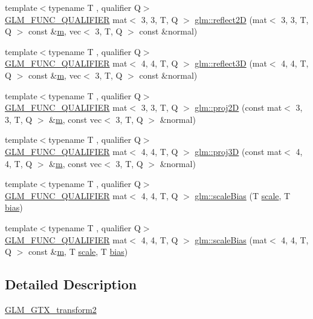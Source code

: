 \begin{DoxyCompactItemize}
\item 
{\footnotesize template$<$typename T , qualifier Q$>$ }\\\hyperlink{setup_8hpp_a33fdea6f91c5f834105f7415e2a64407}{G\+L\+M\+\_\+\+F\+U\+N\+C\+\_\+\+Q\+U\+A\+L\+I\+F\+I\+ER} mat$<$ 3, 3, T, Q $>$ \hyperlink{namespaceglm_ac437357f6021e295f9c4470913141014}{glm\+::reflect2D} (mat$<$ 3, 3, T, Q $>$ const \&\hyperlink{_s_d_l__opengl__glext_8h_af593500c283bf1a787a6f947f503a5c2}{m}, vec$<$ 3, T, Q $>$ const \&normal)
\item 
{\footnotesize template$<$typename T , qualifier Q$>$ }\\\hyperlink{setup_8hpp_a33fdea6f91c5f834105f7415e2a64407}{G\+L\+M\+\_\+\+F\+U\+N\+C\+\_\+\+Q\+U\+A\+L\+I\+F\+I\+ER} mat$<$ 4, 4, T, Q $>$ \hyperlink{namespaceglm_ad1f2111494429316800124b0d31069dc}{glm\+::reflect3D} (mat$<$ 4, 4, T, Q $>$ const \&\hyperlink{_s_d_l__opengl__glext_8h_af593500c283bf1a787a6f947f503a5c2}{m}, vec$<$ 3, T, Q $>$ const \&normal)
\item 
{\footnotesize template$<$typename T , qualifier Q$>$ }\\\hyperlink{setup_8hpp_a33fdea6f91c5f834105f7415e2a64407}{G\+L\+M\+\_\+\+F\+U\+N\+C\+\_\+\+Q\+U\+A\+L\+I\+F\+I\+ER} mat$<$ 3, 3, T, Q $>$ \hyperlink{group__gtx__transform2_ga5b992a0cdc8298054edb68e228f0d93e}{glm\+::proj2D} (const mat$<$ 3, 3, T, Q $>$ \&\hyperlink{_s_d_l__opengl__glext_8h_af593500c283bf1a787a6f947f503a5c2}{m}, const vec$<$ 3, T, Q $>$ \&normal)
\item 
{\footnotesize template$<$typename T , qualifier Q$>$ }\\\hyperlink{setup_8hpp_a33fdea6f91c5f834105f7415e2a64407}{G\+L\+M\+\_\+\+F\+U\+N\+C\+\_\+\+Q\+U\+A\+L\+I\+F\+I\+ER} mat$<$ 4, 4, T, Q $>$ \hyperlink{group__gtx__transform2_gaa2b7f4f15b98f697caede11bef50509e}{glm\+::proj3D} (const mat$<$ 4, 4, T, Q $>$ \&\hyperlink{_s_d_l__opengl__glext_8h_af593500c283bf1a787a6f947f503a5c2}{m}, const vec$<$ 3, T, Q $>$ \&normal)
\item 
{\footnotesize template$<$typename T , qualifier Q$>$ }\\\hyperlink{setup_8hpp_a33fdea6f91c5f834105f7415e2a64407}{G\+L\+M\+\_\+\+F\+U\+N\+C\+\_\+\+Q\+U\+A\+L\+I\+F\+I\+ER} mat$<$ 4, 4, T, Q $>$ \hyperlink{group__gtx__transform2_gabf249498b236e62c983d90d30d63c99c}{glm\+::scale\+Bias} (T \hyperlink{_s_d_l__opengl__glext_8h_a281421b881aa7a1266842b73a3bc7655}{scale}, T \hyperlink{_s_d_l__opengl__glext_8h_a39c3ffa18f420251c5d132dd8c1c6137}{bias})
\item 
{\footnotesize template$<$typename T , qualifier Q$>$ }\\\hyperlink{setup_8hpp_a33fdea6f91c5f834105f7415e2a64407}{G\+L\+M\+\_\+\+F\+U\+N\+C\+\_\+\+Q\+U\+A\+L\+I\+F\+I\+ER} mat$<$ 4, 4, T, Q $>$ \hyperlink{group__gtx__transform2_gae2bdd91a76759fecfbaef97e3020aa8e}{glm\+::scale\+Bias} (mat$<$ 4, 4, T, Q $>$ const \&\hyperlink{_s_d_l__opengl__glext_8h_af593500c283bf1a787a6f947f503a5c2}{m}, T \hyperlink{_s_d_l__opengl__glext_8h_a281421b881aa7a1266842b73a3bc7655}{scale}, T \hyperlink{_s_d_l__opengl__glext_8h_a39c3ffa18f420251c5d132dd8c1c6137}{bias})
\end{DoxyCompactItemize}


\subsection{Detailed Description}
\hyperlink{group__gtx__transform2}{G\+L\+M\+\_\+\+G\+T\+X\+\_\+transform2} 